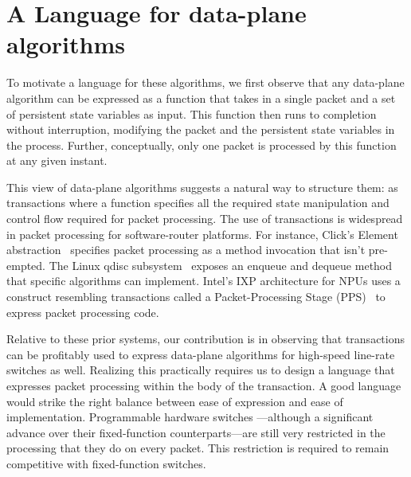 \section{A Language for data-plane algorithms}
\label{s:language}

To motivate a language for these algorithms, we first observe that any
data-plane algorithm can be expressed as a function that takes in a single
packet and a set of persistent state variables as input. This function then
runs to completion without interruption, modifying the packet and the
persistent state variables in the process. Further, conceptually, only one
packet is processed by this function at any given instant.

This view of data-plane algorithms suggests a natural way to structure them: as
transactions where a function specifies all the required state manipulation and
control flow required for packet processing. The use of transactions is
widespread in packet processing for software-router platforms. For instance,
Click's Element abstraction~\cite{click} specifies packet processing as
a method invocation that isn't pre-empted.  The Linux qdisc
subsystem~\cite{qdisc} exposes an enqueue and dequeue method that specific
algorithms can implement. Intel's IXP architecture for NPUs uses a construct
resembling transactions called a Packet-Processing Stage
(PPS)~\cite{npu} to express packet processing code.

Relative to these prior systems, our contribution is in observing that
transactions can be profitably used to express data-plane algorithms for
high-speed line-rate switches as well. Realizing this practically requires us
to design a language that expresses packet processing within the body of the
transaction. A good language would strike the right balance between ease of
expression and ease of implementation. Programmable hardware switches
---although a significant advance over their fixed-function counterparts---are
still very restricted in the processing that they do on every packet. This
restriction is required to remain competitive with fixed-function switches.

